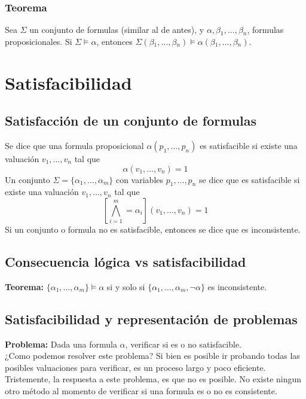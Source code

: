 \documentclass[../main.tex]{subfiles}
\begin{document}
\subsubsection{Teorema}
Sea $\Sigma$ un conjunto de formulas (similar al de antes), y $\alpha{}, \beta{}_{1}, \ldots{}, \beta{}_{n}$, formulas proposicionales. Si $\Sigma{} \models{} \alpha{}$, entonces $\Sigma{}(\beta{}_{1}, \ldots{}, \beta{}_{n}) \models{} \alpha{}(\beta{}_{1}, \ldots{}, \beta{}_{n})$.

\section{Satisfacibilidad}
\subsection{Satisfacción de un conjunto de formulas}
Se dice que una formula proposicional $\alpha(p_{1}, \ldots{}, p_{n})$ es satisfacible si existe una valuación $v_{1}, \ldots{}, v_{n}$ tal que
$$\alpha{}(v_{1}, \ldots{}, v_{n}) = 1$$
Un conjunto $\Sigma = \{ \alpha{}_{1}, \ldots{}, \alpha{}_{m} \}$ con variables $p_{1}, \ldots{}, p_{n}$ se dice que es satisfacible si existe una valuación $v_{1}, \ldots{}, v_{n}$ tal que
$$[ \bigwedge_{i = 1}^{m} = \alpha{}_{i} ] (v_{1}, \ldots{}, v_{n}) = 1$$
Si un conjunto o formula no es satisfacible, entonces se dice que es inconsistente.\\

\subsection{Consecuencia lógica vs satisfacibilidad}
\textbf{Teorema:} $\{\alpha{}_{1}, \ldots{}, \alpha{}_{m}\} \models{} \alpha{}$ si y solo si $\{ \alpha{}_{1}, \ldots{}, \alpha{}_{m}, \neg{} \alpha \}$ es inconsistente.

\subsection{Satisfacibilidad y representación de problemas}
\textbf{Problema:} Dada una formula $\alpha$, verificar si es o no satisfacible.\\
¿Como podemos resolver este problema? Si bien es posible ir probando todas las posibles valuaciones para verificar, es un proceso largo y poco eficiente. Tristemente, la respuesta a este problema, es que no es posible. No existe ningun otro método al momento de verificar si una formula es o no es consistente.
\end{document}

